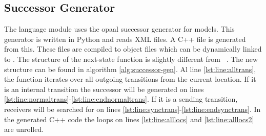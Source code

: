 \subsection{Successor Generator}
The language module uses the opaal successor generator for \uppaal{} models. This generator is written in Python and reads \uppaal{} XML files. A C++ file is generated from this. These files are compiled to object files which can be dynamically linked to \ltsmin{}. The structure of the next-state function is slightly different from ~\cite{eemcs21972}. The new structure can be found in algorithm \ref{alg:successor-gen}. Al line \ref{lst:line:alltrans}, the function iterates over all outgoing transitions from the current location. If it is an internal transition the successor will be generated on lines \ref{lst:line:normaltrans}-\ref{lst:line:endnormaltrans}. If it is a sending transition, receivers will be searched for on lines \ref{lst:line:synctrans}-\ref{lst:line:endsynctrans}. In the generated C++ code the loops on lines \ref{lst:line:alllocs} and \ref{lst:line:alllocs2} are unrolled. 

